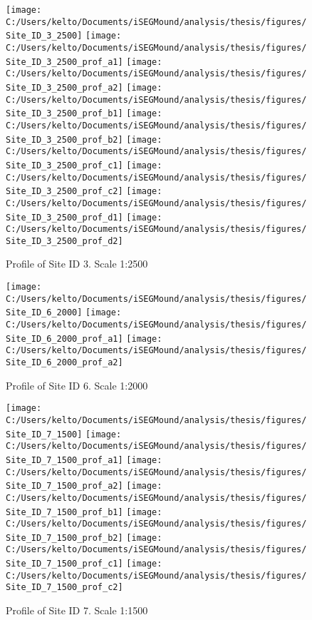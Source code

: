 \documentclass[
  12pt,
]{article}
\begin{document}
\begin{figure}
\texttt{[image: C:/Users/kelto/Documents/iSEGMound/analysis/thesis/figures/Site\_ID\_3\_2500]} \texttt{[image: C:/Users/kelto/Documents/iSEGMound/analysis/thesis/figures/Site\_ID\_3\_2500\_prof\_a1]} \texttt{[image: C:/Users/kelto/Documents/iSEGMound/analysis/thesis/figures/Site\_ID\_3\_2500\_prof\_a2]} \texttt{[image: C:/Users/kelto/Documents/iSEGMound/analysis/thesis/figures/Site\_ID\_3\_2500\_prof\_b1]} \texttt{[image: C:/Users/kelto/Documents/iSEGMound/analysis/thesis/figures/Site\_ID\_3\_2500\_prof\_b2]} \texttt{[image: C:/Users/kelto/Documents/iSEGMound/analysis/thesis/figures/Site\_ID\_3\_2500\_prof\_c1]} \texttt{[image: C:/Users/kelto/Documents/iSEGMound/analysis/thesis/figures/Site\_ID\_3\_2500\_prof\_c2]} \texttt{[image: C:/Users/kelto/Documents/iSEGMound/analysis/thesis/figures/Site\_ID\_3\_2500\_prof\_d1]} \texttt{[image: C:/Users/kelto/Documents/iSEGMound/analysis/thesis/figures/Site\_ID\_3\_2500\_prof\_d2]} \caption{Profile of Site ID 3. Scale 1:2500}\label{fig:FigureAOI4-3}
\end{figure}

\begin{figure}
\texttt{[image: C:/Users/kelto/Documents/iSEGMound/analysis/thesis/figures/Site\_ID\_6\_2000]} \texttt{[image: C:/Users/kelto/Documents/iSEGMound/analysis/thesis/figures/Site\_ID\_6\_2000\_prof\_a1]} \texttt{[image: C:/Users/kelto/Documents/iSEGMound/analysis/thesis/figures/Site\_ID\_6\_2000\_prof\_a2]} \caption{Profile of Site ID 6. Scale 1:2000}\label{fig:FigureAOI4-6}
\end{figure}

\begin{figure}
\texttt{[image: C:/Users/kelto/Documents/iSEGMound/analysis/thesis/figures/Site\_ID\_7\_1500]} \texttt{[image: C:/Users/kelto/Documents/iSEGMound/analysis/thesis/figures/Site\_ID\_7\_1500\_prof\_a1]} \texttt{[image: C:/Users/kelto/Documents/iSEGMound/analysis/thesis/figures/Site\_ID\_7\_1500\_prof\_a2]} \texttt{[image: C:/Users/kelto/Documents/iSEGMound/analysis/thesis/figures/Site\_ID\_7\_1500\_prof\_b1]} \texttt{[image: C:/Users/kelto/Documents/iSEGMound/analysis/thesis/figures/Site\_ID\_7\_1500\_prof\_b2]} \texttt{[image: C:/Users/kelto/Documents/iSEGMound/analysis/thesis/figures/Site\_ID\_7\_1500\_prof\_c1]} \texttt{[image: C:/Users/kelto/Documents/iSEGMound/analysis/thesis/figures/Site\_ID\_7\_1500\_prof\_c2]} \caption{Profile of Site ID 7. Scale 1:1500}\label{fig:FigureAOI4-7}
\end{figure}
\end{document}
